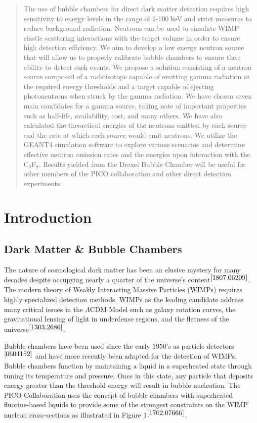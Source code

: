 \documentclass[%
12pt,
twoside,
reprint,
amsmath,amssymb,
aps,
]{article}
\begin{document}
	\begin{abstract}
	\doublespacing
	\par The use of bubble chambers for direct dark matter detection requires high sensitivity to energy levels in the range of 1-100 keV and strict measures to reduce background radiation. Neutrons can be used to simulate WIMP elastic scattering interactions with the target volume in order to ensure high detection efficiency. We aim to develop a low energy neutron source that will allow us to properly calibrate bubble chambers to ensure their ability to detect such events. We propose a solution consisting of a neutron source composed of a radioisotope capable of emitting gamma radiation at the required energy thresholds and a target capable of ejecting photoneutrons when struck by the gamma radiation. We have chosen seven main candidates for a gamma source, taking note of important properties such as half-life, availability, cost, and many others. We have also calculated the theoretical energies of the neutrons emitted by each source and the rate at which each source would emit neutrons. We utilize the GEANT4 simulation software to explore various scenarios and determine effective neutron emission rates and the energies upon interaction with the C$_{3}$F$_{8}$. Results yielded from the Drexel Bubble Chamber will be useful for other members of the PICO collaboration and other direct detection experiments.
	\end{abstract}
	
	\section{Introduction}
	\doublespacing
	\subsection{Dark Matter \& Bubble Chambers}
	\par The nature of cosmological dark matter has been an elusive mystery for many decades despite occupying nearly a quarter of the universe's content$^{\cite{1807.06209}}$. The modern theory of Weakly Interacting Massive Particles (WIMPs) requires highly specialized detection methods. WIMPs as the leading candidate address many critical issues in the $\Lambda$CDM Model such as galaxy rotation curves, the gravitational lensing of light in underdense regions, and the flatness of the universe$^{\cite{1303.2686}}$. 
	\par Bubble chambers have been used since the early 1950's as particle detectors$^{\cite{0604152}}$ and have more recently been adapted for the detection of WIMPs. Bubble chambers function by maintaining a liquid in a superheated state through tuning its temperature and pressure. Once in this state, any particle that deposits energy greater than the threshold energy will result in bubble nucleation. The PICO Collaboration uses the concept of bubble chambers with superheated fluorine-based liquids to provide some of the strongest constraints on the WIMP nucleon cross-sections as illustrated in Figure 1$^{\cite{1702.07666}}$.
	
\end{document}
